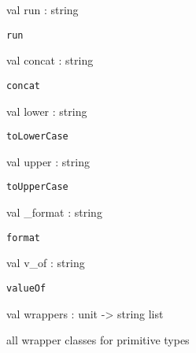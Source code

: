 \documentclass[11pt]{article}
\begin{document}
\begin{ocamldocsigend}
\begin{ocamldocdescription}
\end{ocamldocdescription}


\label{val:Java.Lang.run}\begin{ocamldoccode}
val run : string
\end{ocamldoccode}
\begin{ocamldocdescription}
{\tt{run}}


\end{ocamldocdescription}


\label{val:Java.Lang.concat}\begin{ocamldoccode}
val concat : string
\end{ocamldoccode}
\begin{ocamldocdescription}
{\tt{concat}}


\end{ocamldocdescription}


\label{val:Java.Lang.lower}\begin{ocamldoccode}
val lower : string
\end{ocamldoccode}
\begin{ocamldocdescription}
{\tt{toLowerCase}}


\end{ocamldocdescription}


\label{val:Java.Lang.upper}\begin{ocamldoccode}
val upper : string
\end{ocamldoccode}
\begin{ocamldocdescription}
{\tt{toUpperCase}}


\end{ocamldocdescription}


\label{val:Java.Lang.-underscoreformat}\begin{ocamldoccode}
val _format : string
\end{ocamldoccode}
\begin{ocamldocdescription}
{\tt{format}}


\end{ocamldocdescription}


\label{val:Java.Lang.v-underscoreof}\begin{ocamldoccode}
val v_of : string
\end{ocamldoccode}
\begin{ocamldocdescription}
{\tt{valueOf}}


\end{ocamldocdescription}


\label{val:Java.Lang.wrappers}\begin{ocamldoccode}
val wrappers : unit -> string list
\end{ocamldoccode}
\begin{ocamldocdescription}
all wrapper classes for primitive types


\end{ocamldocdescription}
\end{ocamldocsigend}
\end{document}
